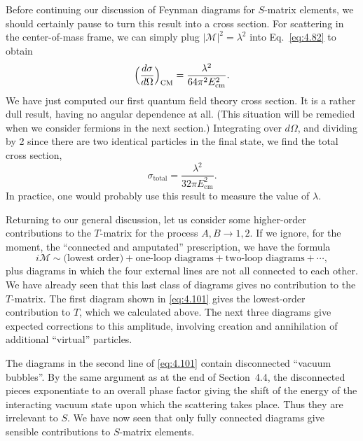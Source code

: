 Before continuing our discussion of Feynman diagrams for $S$-matrix elements,
we should certainly pause to turn this result into a cross section.  For
scattering in the center-of-mass frame, we can simply plug
$|\mathcal{M}|^2 = \lambda^2$ into Eq.~\eqref{eq:4.82} to obtain
\begin{equation}
  \Bigl( \frac{d\sigma}{d\Omega} \Bigr)_{\mathrm{CM}}
    = \frac{\lambda^2}{64\pi^2E_{\mathrm{cm}}^2} .
  \label{eq:4.99}
\end{equation}
We have just computed our first quantum field theory cross section.  It is a
rather dull result, having no angular dependence at all.  (This situation
will be remedied when we consider fermions in the next section.)  Integrating
over $d\Omega$, and dividing by 2 since there are two identical particles in
the final state, we find the total cross section,
\begin{equation}
  \sigma_{\mathrm{total}} = \frac{\lambda^2}{32\pi E_{\mathrm{cm}}^2} .
  \label{eq:4.100}
\end{equation}
In practice, one would probably use this result to measure the value of
$\lambda$.

Returning to our general discussion, let us consider some higher-order
contributions to the $T$-matrix for the process $A, B \to 1, 2$.  If we
ignore, for the moment, the ``connected and amputated'' prescription, we have
the formula
\begin{equation}
  i\mathcal{M} \sim \text{(lowest order)} + \text{one-loop diagrams}
    + \text{two-loop diagrams} + \cdots ,
  \label{eq:4.101}
\end{equation}
plus diagrams in which the four external lines are not all connected to each
other.  We have already seen that this last class of diagrams gives no
contribution to the $T$-matrix.  The first diagram shown in \eqref{eq:4.101}
gives the lowest-order contribution to $T$, which we calculated above.  The
next three diagrams give expected corrections to this amplitude, involving
creation and annihilation of additional ``virtual'' particles.

The diagrams in the second line of \eqref{eq:4.101} contain disconnected
``vacuum bubbles''.  By the same argument as at the end of Section~4.4, the
disconnected pieces exponentiate to an overall phase factor giving the shift
of the energy of the interacting vacuum state upon which the scattering takes
place.  Thus they are irrelevant to $S$.  We have now seen that only fully
connected diagrams give sensible contributions to $S$-matrix elements.

